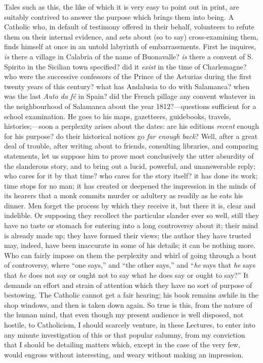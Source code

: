 Tales such as this, the like of which it is very easy
to point out in print, are suitably contrived to answer
the purpose which brings them into being. A Catholic who,
in default of testimony offered in their behalf,
volunteers to refute them on their internal evidence, and
sets about (so to say) cross-examining them, finds
himself at once in an untold labyrinth of embarrassments.
First he inquires, \emph{is} there a village in
Calabria of the name of Buonavalle? \emph{is} there a
convent of S. Spirito in the Sicilian town specified? did
it \emph{exist} in the time of Charlemagne? who were
the successive confessors of the Prince of the Asturias
during the first twenty years of this century? what has
Andalusia to do with Salamanca? when was the last \emph{Auto
da fé} in Spain? did the French pillage any convent
whatever in the neighbourhood of Salamanca about the year
1812?—questions sufficient for a school examination.
He goes to his maps, gazetteers, guidebooks, travels,
histories;—soon a perplexity arises about the dates:
are his editions \emph{recent} enough for his purpose?
do their historical notices go \emph{far enough back}?
Well, after a great deal of trouble, after writing about
to friends, consulting libraries, and comparing
statements, let us suppose him to prove most conclusively
the utter absurdity of the slanderous story, and to bring
out a lucid, powerful, and unanswerable reply; who cares
for it by that time? who cares for the story itself? it
has done its work; time stops for no man; it has created
or deepened the impression in the minds of its hearers
that a monk commits murder or adultery as readily as he
eats his dinner. Men forget the process by which they
receive it, but there it is, clear and indelible. Or
supposing they recollect the particular slander ever so
well, still they have no taste or stomach for entering
into a long controversy about it; their mind is already
made up; they have formed their views; the author they
have trusted may, indeed, have been inaccurate in some of
his details; it can be nothing more. Who can fairly
impose on them the perplexity and whirl of going through
a bout of controversy, where ``one says,'' and
``the other says,'' and ``\emph{he} says
that \emph{he} says that \emph{he} does not say or
ought not to say what he does say or ought to say?''
It demands an effort and strain of attention which they
have no sort of purpose of bestowing. The Catholic cannot
get a fair hearing; his book remains awhile in the shop
windows, and then is taken down again. So true is this,
from the nature of the human mind, that even though my
present audience is well disposed, not hostile, to
Catholicism, I should scarcely venture, in these
Lectures, to enter into any minute investigation of this
or that popular calumny, from my conviction that I should
be detailing matters which, except in the case of the
very few, would engross without interesting, and weary
without making an impression.

